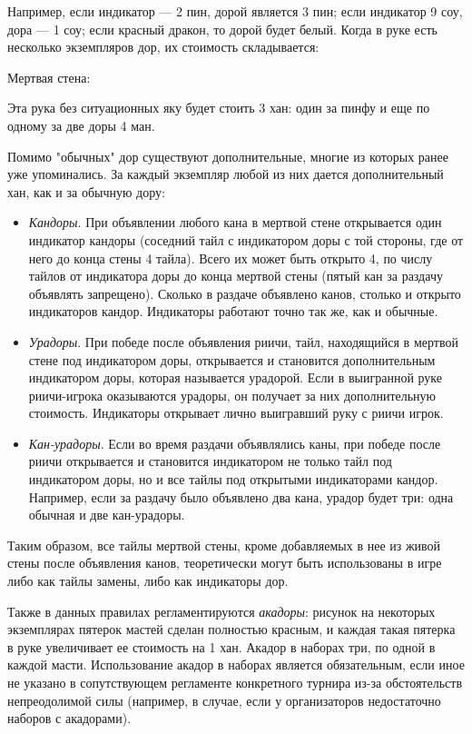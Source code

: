 Например, если индикатор --- 2 пин, дорой является 3 пин; если индикатор 9 соу, дора --- 1 соу; если красный дракон, то дорой будет белый.
Когда в руке есть несколько экземпляров дор, их стоимость складывается:


Мертвая стена:

Эта рука без ситуационных яку будет стоить 3 хан: один за пинфу и еще по одному за две доры 4 ман.

Помимо "обычных" дор существуют дополнительные, многие из которых ранее уже упоминались. За каждый экземпляр любой из них дается дополнительный хан, как и за обычную дору:
\begin{itemize}
	\item \textit{Кандоры}. При объявлении любого кана в мертвой стене открывается один индикатор кандоры (соседний тайл с индикатором доры с той стороны, где от него до конца стены 4 тайла). Всего их может быть открыто 4, по числу тайлов от индикатора доры до конца мертвой стены (пятый кан за раздачу объявлять запрещено). Сколько в раздаче объявлено канов, столько и открыто индикаторов кандор. Индикаторы работают точно так же, как и обычные.
	\item \textit{Урадоры}. При победе после объявления риичи, тайл, находящийся в мертвой стене под индикатором доры, открывается и становится дополнительным индикатором доры, которая называется урадорой. Если в выигранной руке риичи-игрока оказываются урадоры, он получает за них дополнительную стоимость. Индикаторы открывает лично выигравший руку с риичи игрок.
	\item \textit{Кан-урадоры}. Если во время раздачи объявлялись каны, при победе после риичи открывается и становится индикатором не только тайл под индикатором доры, но и все тайлы под открытыми индикаторами кандор. Например, если за раздачу было объявлено два кана, урадор будет три: одна обычная и две кан-урадоры.
\end{itemize}

Таким образом, все тайлы мертвой стены, кроме добавляемых в нее из живой стены после объявления канов, теоретически могут быть использованы в игре либо как тайлы замены, либо как индикаторы дор.

Также в данных правилах регламентируются \textit{акадоры}: рисунок на некоторых экземплярах пятерок мастей сделан полностью красным, и каждая такая пятерка в руке увеличивает ее стоимость на 1 хан. Акадор в наборах три, по одной в каждой масти. Использование акадор в наборах является обязательным, если иное не указано в сопутствующем регламенте конкретного турнира из-за обстоятельств непреодолимой силы (например, в случае, если у организаторов недостаточно наборов с акадорами).

